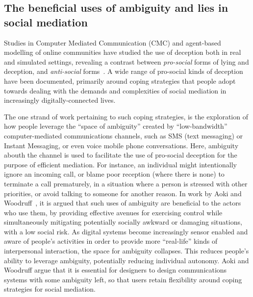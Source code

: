\documentclass{IOS-Book-Article}     %
\begin{document}
\subsection{The beneficial uses of ambiguity and lies in social mediation}

Studies in Computer Mediated Communication (CMC) and agent-based modelling of
online communities have studied the use of deception both in real and simulated
settings, revealing a contrast between \emph{pro-social} forms of lying and
deception, and \emph{anti-social} forms~\cite{iniguez2014Deception}.
A wide range of pro-social kinds of deception have
been documented, primarily around coping strategies that people adopt towards
dealing with the demands and complexities of social mediation in increasingly
digitally-connected lives.            

The one strand of work pertaining to such coping strategies, is the exploration
of how people leverage the ``space of ambiguity'' created by
``low-bandwidth'' computer-mediated communications channels, such as SMS (text
messaging) or Instant Messaging, or even voice mobile phone conversations. Here,
ambiguity abouth the channel is used to facilitate the use of pro-social
deception for the purpose of efficient mediation.  
For instance, an individual might intentionally ignore an incoming
call, or blame poor reception (where there is none) to terminate a call
prematurely, in a situation where a person is stressed with other priorities, or
avoid talking to someone for another reason.  In work by Aoki and
Woodruff~\cite{Aoki:2005:MSS:1054972.1054998}, it is argued that such uses of
ambiguity are beneficial to the actors who use them, by providing effective
avenues for exercising control while simultaneously mitigating potentially
socially awkward or damaging situations, with a low social risk.  
As digital systems become increasingly   sensor enabled and
aware of people's activities in order to provide more ``real-life'' kinds of
interpersonal interaction, the space for ambiguity collapses. This reduces
people's ability to leverage ambiguity, potentially reducing 
individual autonomy.  
Aoki and Woodruff argue that it is essential for
designers to design communications systems  with some ambiguity left, so that
users retain flexibility around coping strategies for social mediation.
\end{document}
